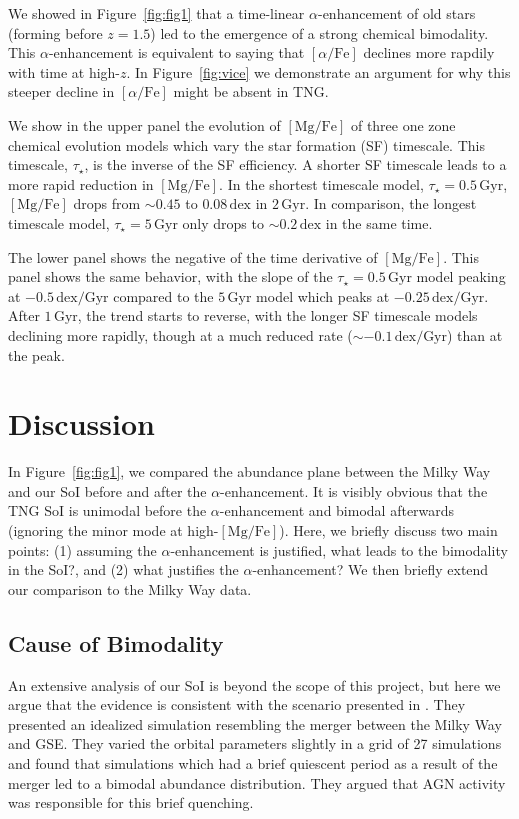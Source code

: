 \documentclass[linenumbers, twocolumn]{aastex631}
\newcommand{\Gyr}{\ensuremath{\textrm{Gyr}}}
\newcommand{\MgFe}{\ensuremath{[\textrm{Mg}/\textrm{Fe}]}}
\newcommand{\alphaFe}{\ensuremath{[\alpha/\textrm{Fe}]}}
\newcommand{\dex}{\ensuremath{\textrm{dex}}}
\begin{document}
We showed in Figure~\ref{fig:fig1} that a time-linear $\alpha$-enhancement of old stars (forming before $z=1.5$) led to the emergence of a strong chemical bimodality. This $\alpha$-enhancement is equivalent to saying that \alphaFe{} declines more rapdily with time at high-$z$. In Figure~\ref{fig:vice} we demonstrate an argument for why this steeper decline in \alphaFe{} might be absent in TNG.

We show in the upper panel the evolution of \MgFe{} of three one zone chemical evolution models which vary the star formation (SF) timescale. This timescale, $\tau_{\star}$, is the inverse of the SF efficiency. A shorter SF timescale leads to a more rapid reduction in \MgFe{}. In the shortest timescale model, $\tau_{\star}=0.5\,\Gyr$, \MgFe{} drops from $\sim0.45$ to $0.08\,\dex$ in $2\,\Gyr$. In comparison, the longest timescale model, $\tau_{\star}=5\,\Gyr$ only drops to $\sim0.2\,\dex$ in the same time.

The lower panel shows the negative of the time derivative of \MgFe{}. This panel shows the same behavior, with the slope of the $\tau_{\star}=0.5\,\Gyr$ model peaking at $-0.5\,\dex/\Gyr$ compared to the $5\,\Gyr$ model which peaks at $-0.25\,\dex/\Gyr$. After $1\,\Gyr$, the trend starts to reverse, with the longer SF timescale models declining more rapidly, though at a much reduced rate ($\sim-0.1\,\dex/\Gyr$) than at the peak.

\section{Discussion}\label{sec:disc}
In Figure~\ref{fig:fig1}, we compared the abundance plane between the Milky Way and our SoI before and after the $\alpha$-enhancement. It is visibly obvious that the TNG SoI is unimodal before the $\alpha$-enhancement and bimodal afterwards (ignoring the minor mode at high-\MgFe{}). Here, we briefly discuss two main points: (1) assuming the $\alpha$-enhancement is justified, what leads to the bimodality in the SoI?, and (2) what justifies the $\alpha$-enhancement? We then briefly extend our comparison to the Milky Way data.

\subsection{Cause of Bimodality}\label{ssec:bim_cause}
An extensive analysis of our SoI is beyond the scope of this project, but here we argue that the evidence is consistent with the scenario presented in \citet{2024arXiv240707985B}. They presented an idealized simulation resembling the merger between the Milky Way and GSE. They varied the orbital parameters slightly in a grid of 27 simulations and found that simulations which had a brief quiescent period as a result of the merger led to a bimodal abundance distribution. They argued that AGN activity was responsible for this brief quenching.
\end{document}
